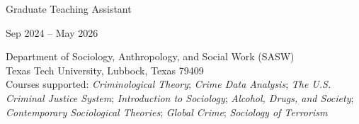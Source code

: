 \documentclass[letterpaper,10pt]{article}
\begin{document}
    \begin{minipage} {.75\linewidth}
        \begin{flushleft}
            Graduate Teaching Assistant
        \end{flushleft}
    \end{minipage}
    \hfill
    \begin{minipage} {.20\linewidth}  \begin{flushright}
            Sep 2024 – May 2026
        \end{flushright} \end{minipage}
    Department of Sociology, Anthropology, and Social Work (SASW)\\
    Texas Tech University, Lubbock, Texas 79409\\
    \vspace{0.3em}
    Courses supported: \textit{Criminological Theory}; \textit{Crime Data Analysis}; \textit{The U.S. Criminal Justice System}; \textit{Introduction to Sociology}; \textit{Alcohol, Drugs, and Society}; \textit{Contemporary Sociological Theories}; \textit{Global Crime}; \textit{Sociology of Terrorism}\\
    \vspace{0.3em}
\end{document}
